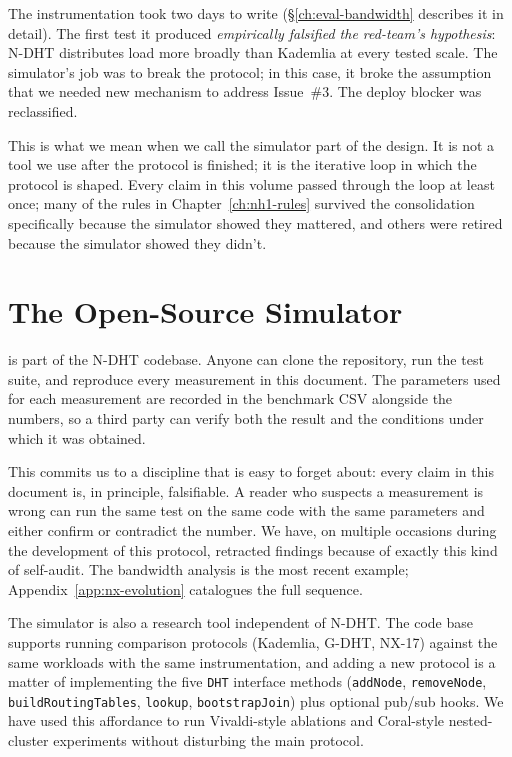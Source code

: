 \documentclass[twoside,nobib]{tufte-book}
\newcommand{\NDHT}{N-DHT\xspace}
\newcommand{\GDHT}{G-DHT\xspace}
\begin{document}
The instrumentation took two days to write
(\S\ref{ch:eval-bandwidth} describes it in detail). The first
test it produced \emph{empirically falsified the red-team's
hypothesis}: \NDHT distributes load more broadly than Kademlia at
every tested scale. The simulator's job was to break the
protocol; in this case, it broke the assumption that we needed
new mechanism to address Issue~\#3. The deploy blocker was
reclassified.

This is what we mean when we call the simulator part of the
design. It is not a tool we use after the protocol is finished;
it is the iterative loop in which the protocol is shaped.
Every claim in this volume passed through the loop at least
once; many of the rules in Chapter~\ref{ch:nh1-rules} survived
the consolidation specifically because the simulator showed they
mattered, and others were retired because the simulator showed
they didn't.

\section{The Open-Source Simulator}

 is part of the
\NDHT codebase. Anyone can clone the repository, run the test
suite, and reproduce every measurement in this document. The
parameters used for each measurement are recorded in the
benchmark CSV alongside the numbers, so a third party can
verify both the result and the conditions under which it was
obtained.

This commits us to a discipline that is easy to forget about: every
claim in this document is, in principle, falsifiable. A reader
who suspects a measurement is wrong can run the same test on the
same code with the same parameters and either confirm or
contradict the number. We have, on multiple occasions during the
development of this protocol, retracted findings because of
exactly this kind of self-audit. The bandwidth analysis is the
most recent example; Appendix~\ref{app:nx-evolution} catalogues
the full sequence.

The simulator is also a research tool independent of \NDHT. The
code base supports running comparison protocols (Kademlia, \GDHT,
NX-17) against the same workloads with the same instrumentation,
and adding a new protocol is a matter of implementing the
five \texttt{DHT} interface methods (\texttt{addNode},
\texttt{removeNode}, \texttt{buildRoutingTables},
\texttt{lookup}, \texttt{bootstrapJoin}) plus optional pub/sub
hooks. We have used this affordance to run Vivaldi-style
ablations and Coral-style nested-cluster experiments without
disturbing the main protocol.
\end{document}
